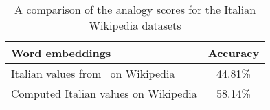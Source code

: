 
\begin{table}
  \begin{tabularx}{\textwidth}{Xc}
    \toprule
    \textbf{Word embeddings}& \textbf{Accuracy} \\
    \midrule
    Italian values from~\cite{berardi2015word} on Wikipedia & 44.81\% \\
    Computed Italian values on Wikipedia & 58.14\% \\
    \bottomrule
  \end{tabularx}
  \caption{A comparison of the analogy scores for the Italian Wikipedia datasets}\label{tab:italianEmbeddingsAnalogy}
\end{table}